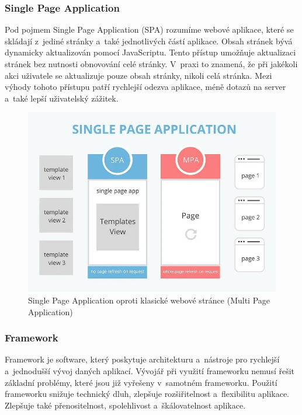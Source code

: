\subsubsection*{Single Page Application}

Pod pojmem Single Page Application (SPA) rozumíme webové aplikace, které se skládají z~jediné stránky a~také jednotlivých částí aplikace. 
Obsah stránek bývá dynamicky aktualizován pomocí JavaScriptu. Tento přístup umožňuje aktualizaci stránek bez nutnosti obnovování celé stránky. 
V~praxi to znamená, že při jakékoli akci uživatele se aktualizuje pouze obsah stránky, nikoli celá stránka. 
Mezi výhody tohoto přístupu patří rychlejší odezva aplikace, méně dotazů na server a~také lepší uživatelský zážitek.\cite{jadhavspa}

\begin{figure}[htb]
	\centering
		\includegraphics[width=.75\textwidth]{images/SPAvsMPA.jpg}
	\caption[Single Page Application oproti klasické webové stránce (Multi Page Application)]{Single Page Application oproti klasické webové stránce (Multi Page Application) \cite{fergusonspavsmpa}}
	\label{fig:spavsmpa}
\end{figure}

\subsubsection*{Framework}

Framework je software, který poskytuje architekturu a~nástroje pro rychlejší a~jednodušší vývoj daných aplikací. 
Vývojář při využití frameworku nemusí řešit základní problémy, které jsou již vyřešeny v~samotném frameworku. 
Použití frameworku snižuje technický dluh, zlepšuje rozšiřitelnost a~flexibilitu aplikace. 
Zlepšuje také přenositelnost, spolehlivost a~škálovatelnost aplikace.\cite{schmidtframeworks}